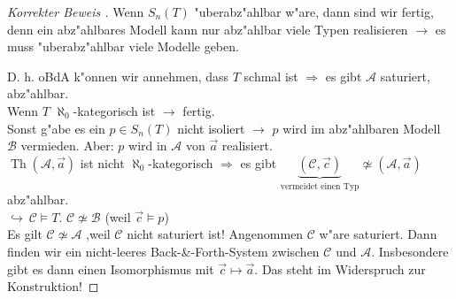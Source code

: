 \documentclass[a4paper,12pt,numbers=noenddot,parskip=full]{scrartcl}
\newcommand{\scrA}{\mathcal{A}}
\newcommand{\scrB}{\mathcal{B}}
\newcommand{\scrC}{\mathcal{C}}
\DeclareMathOperator{\Th}{Th}
\theoremstyle{dotless}
\begin{document}
\begin{proof}[Korrekter Beweis ] \label{korrekt}
	Wenn $S_n(T)$ "uberabz"ahlbar w"are, dann sind wir fertig, denn ein abz"ahlbares Modell kann nur abz"ahlbar viele Typen realisieren $\rightarrow$ es muss "uberabz"ahlbar viele Modelle geben.
	
	D. h. oBdA k"onnen wir annehmen, dass $T$ schmal ist $\Rightarrow$ es gibt $\scrA$ saturiert, abz"ahlbar.\\
	Wenn $T$ $\aleph_0$-kategorisch ist $\rightarrow$ fertig.\\
	Sonst g"abe es ein $p \in S_n(T)$ nicht isoliert $\rightarrow$ $p$ wird im abz"ahlbaren Modell $\scrB$ vermieden. Aber: $p$ wird in $\scrA$ von $\vec{a}$ realisiert.\\
	$\Th(\scrA, \vec{a})$ ist nicht $\aleph_0$-kategorisch $\Rightarrow$ es gibt $\underbrace{(\scrC, \vec{c})}_\text{vermeidet einen Typ} \not\simeq (\scrA, \vec{a})$ abz"ahlbar.\\
	$\hookrightarrow~ \scrC \models T$. $\scrC \not\simeq \scrB$ (weil $\vec{c} \models p$)\\
	Es gilt $\scrC \not\simeq \scrA$ ,weil $\scrC$ nicht saturiert ist! Angenommen $\scrC$ w"are saturiert. Dann finden wir ein nicht-leeres Back-\&-Forth-System zwischen $\scrC$ und $\scrA$. Insbesondere gibt es dann einen Isomorphismus mit $\vec{c} \longmapsto \vec{a}$. Das steht im Widerspruch zur Konstruktion!
\end{proof}

\newpage
\end{document}
